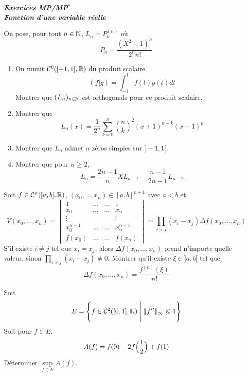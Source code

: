 \documentclass[12pt]{article}
\begin{document}
\begin{titlepage}
	\centering
	\vspace*{\fill}
	\Huge \textit{\textbf{Exercices MP/MP$^*$\\ Fonction d'une variable réelle}}
	\vspace*{\fill}
\end{titlepage}

\begin{exercise}
	On pose, pour tout $n\in\mathbb{N}$, $L_{n}=P_{n}^{(n)}$ où 
	$$P_{n}=\frac{(X^{2}-1)^{n}}{2^{n}n!}$$
	\begin{enumerate}
		\item On munit $\mathcal{C}^{0}([-1,1],\mathbb{R})$ du produit scalaire
		$$(f|g)=\int_{-1}^{1}f(t)g(t)dt$$
		Montrer que $(L_{n})_{n\in\mathbb{N}}$ est orthogonale pour ce produit scalaire.

		\item Montrer que 
		$$L_{n}(x)=\frac{1}{2^{n}}\sum_{k=0}^{n}\binom{n}{k}^{2}(x+1)^{n-k}(x-1)^{k}$$
		
		\item Montrer que $L_{n}$ admet $n$ zéros simples sur $]-1,1[$.
		\item Montrer que pour $n\geqslant2$,
		$$L_{n}=\frac{2n-1}{n}XL_{n-1}-\frac{n-1}{2n-1}L_{n-2}$$
	\end{enumerate}
\end{exercise}

\begin{exercise}
	Soit $f\in\mathcal{C}^{n}([a,b],\mathbb{R})$, $(x_{0},\dots,x_{n})\in[a,b]^{n+1}$ avec $a<b$ et
	$$V(x_{0},\dots,x_{n})
	=
	\begin{vmatrix}
		1 & \dots & \dots & 1\\
		x_{0} & \dots & \dots &x_{n}\\
		\vdots & & &\vdots\\
		x_{0}^{n-1} & \dots &\dots  &x_{n}^{n-1}\\
		f(x_{0}) & \dots  &\dots & f(x_{n})
	\end{vmatrix}
	=\prod_{i>j}(x_{i}-x_{j})\Delta f(x_{0},\dots,x_{n})$$
	S'il existe $i\neq j$ tel que $x_{i}=x_{j}$, alors $\Delta f(x_{0},\dots,x_{n})$ prend n'importe quelle valeur, sinon $\prod_{i>j}(x_{i}-x_{j})\neq0$. Montrer qu'il existe $\xi\in]a,b[$ tel que 
	$$\Delta f(x_{0},\dots,x_{n})=\frac{f^{(n)}(\xi)}{n!}$$
\end{exercise}

\begin{exercise}
	Soit 
	$$E=\Biggl\{f\in\mathcal{C}^{2}([0,1],\mathbb{R})\Biggm|\Vert f''\Vert_{\infty}\leqslant 1\Biggr\}$$
	Soit pour $f\in E$,
	$$A(f)=f(0)-2f\Bigl(\frac{1}{2}\Bigr)+f(1)$$
	Déterminer $\sup\limits_{f\in E}A(f)$.
\end{exercise}
\end{document}
